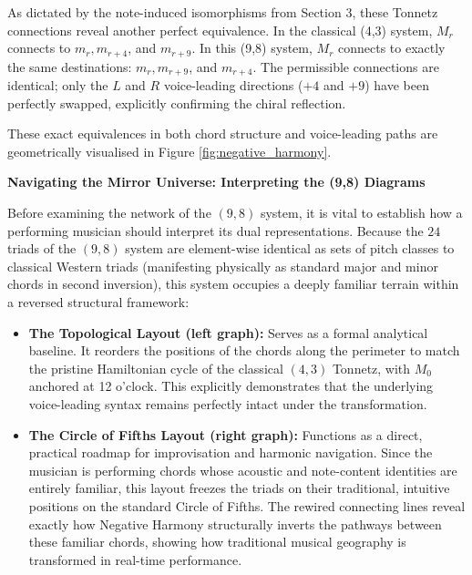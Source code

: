 \documentclass[11pt,letterpaper]{amsart}
\begin{document}
As dictated by the note-induced isomorphisms from Section 3, these Tonnetz connections reveal another perfect equivalence. In the classical (4,3) system, $M_r$ connects to $m_r, m_{r+4}$, and $m_{r+9}$. In this (9,8) system, $M_r$ connects to exactly the same destinations: $m_r, m_{r+9}$, and $m_{r+4}$. The permissible connections are identical; only the $L$ and $R$ voice-leading directions ($+4$ and $+9$) have been perfectly swapped, explicitly confirming the chiral reflection.

These exact equivalences in both chord structure and voice-leading paths are geometrically visualised in Figure \ref{fig:negative_harmony}.
\vspace{0.4cm}

\noindent\textbf{Navigating the Mirror Universe: Interpreting the (9,8) Diagrams}

Before examining the network of the $(9,8)$ system, it is vital to establish how a performing musician should interpret its dual representations. Because the $24$ triads of the $(9,8)$ system are element-wise identical as sets of pitch classes to classical Western triads (manifesting physically as standard major and minor chords in second inversion), this system occupies a deeply familiar terrain within a reversed structural framework:

\begin{itemize}
    \item \textbf{The Topological Layout (left graph):} Serves as a formal analytical baseline. It reorders the positions of the chords along the perimeter to match the pristine Hamiltonian cycle of the classical $(4,3)$ Tonnetz, with $M_0$ anchored at 12 o'clock. This explicitly demonstrates that the underlying voice-leading syntax remains perfectly intact under the transformation.
    \item \textbf{The Circle of Fifths Layout (right graph):} Functions as a direct, practical roadmap for improvisation and harmonic navigation. Since the musician is performing chords whose acoustic and note-content identities are entirely familiar, this layout freezes the triads on their traditional, intuitive positions on the standard Circle of Fifths. The rewired connecting lines reveal exactly how Negative Harmony structurally inverts the pathways between these familiar chords, showing how traditional musical geography is transformed in real-time performance.
\end{itemize}
\vspace{0.4cm}
\end{document}
